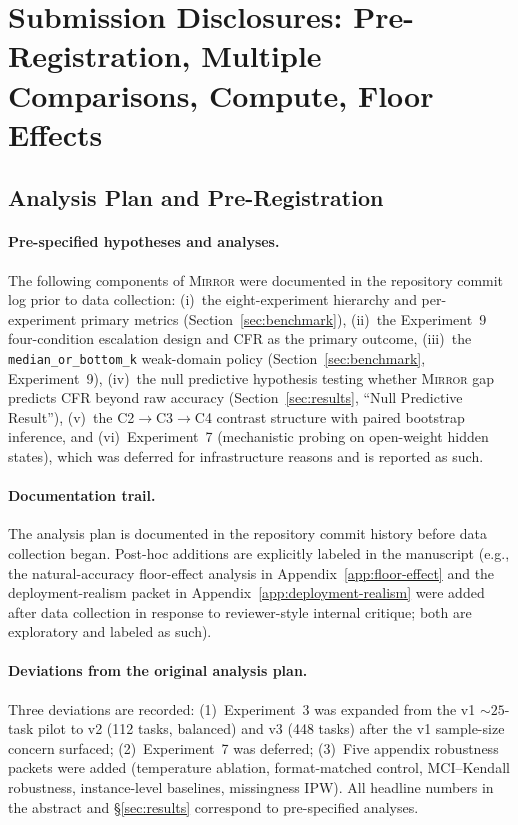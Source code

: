 \documentclass[10pt]{article}
\newcommand{\mirror}{\textsc{Mirror}}
\newcommand{\CFR}{CFR}
\begin{document}
\section{Submission Disclosures: Pre-Registration, Multiple Comparisons, Compute, Floor Effects}
\label{app:disclosures}

\subsection{Analysis Plan and Pre-Registration}
\label{app:prereg}

\paragraph{Pre-specified hypotheses and analyses.}
The following components of \mirror{} were documented in the repository commit log prior to data collection: (i)~the eight-experiment hierarchy and per-experiment primary metrics (Section~\ref{sec:benchmark}), (ii)~the Experiment~9 four-condition escalation design and \CFR{} as the primary outcome, (iii)~the \texttt{median\_or\_bottom\_k} weak-domain policy (Section~\ref{sec:benchmark}, Experiment~9), (iv)~the null predictive hypothesis testing whether \mirror{} gap predicts \CFR{} beyond raw accuracy (Section~\ref{sec:results}, ``Null Predictive Result''), (v)~the C2$\to$C3$\to$C4 contrast structure with paired bootstrap inference, and (vi)~Experiment~7 (mechanistic probing on open-weight hidden states), which was deferred for infrastructure reasons and is reported as such.

\paragraph{Documentation trail.}
The analysis plan is documented in the repository commit history before data collection began. Post-hoc additions are explicitly labeled in the manuscript (e.g., the natural-accuracy floor-effect analysis in Appendix~\ref{app:floor-effect} and the deployment-realism packet in Appendix~\ref{app:deployment-realism} were added after data collection in response to reviewer-style internal critique; both are exploratory and labeled as such).

\paragraph{Deviations from the original analysis plan.}
Three deviations are recorded: (1)~Experiment~3 was expanded from the v1 ${\sim}25$-task pilot to v2 (112 tasks, balanced) and v3 (448 tasks) after the v1 sample-size concern surfaced; (2)~Experiment~7 was deferred; (3)~Five appendix robustness packets were added (temperature ablation, format-matched control, MCI--Kendall robustness, instance-level baselines, missingness IPW). All headline numbers in the abstract and \S\ref{sec:results} correspond to pre-specified analyses.
\end{document}
